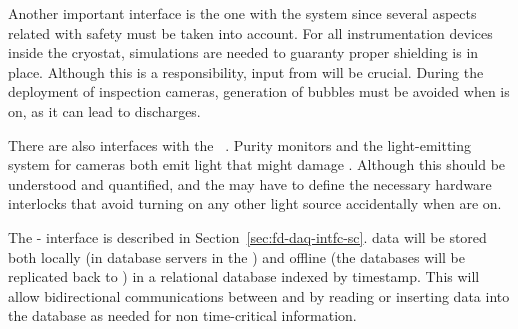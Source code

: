 Another important interface is the one with the  system \cite{bib:docdb6787} since several aspects related with safety must be taken into account. 
For all instrumentation devices inside the cryostat, \efield simulations are needed to guaranty proper shielding is in place.
Although this is a  responsibility, input from  will be crucial.
During the deployment of inspection cameras, generation of bubbles must be avoided when  is on, as it can lead to discharges.

There are also interfaces with the ~\cite{bib:docdb6730}. Purity monitors and the light-emitting system for cameras both emit light that might damage .
Although this should be understood and quantified,  and the \single {} may have to define the necessary hardware interlocks
that avoid turning on any other light source accidentally when  are on.

The - interface \cite{bib:docdb6790} is described in Section~\ref{sec:fd-daq-intfc-sc}. %
 data will be stored both locally (in  database servers in the
) and offline (the databases will be replicated back to \fnal)
in a relational database indexed by timestamp.
This will allow bidirectional communications between  and  by
reading or inserting data into the database as needed for non
time-critical information.  




